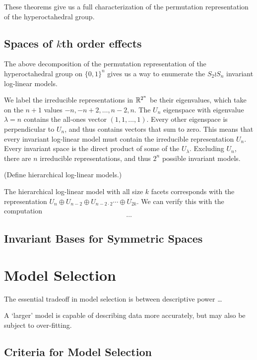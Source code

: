 \documentclass[cclicense]{hmcthesis}
\numberwithin{equation}{chapter}
\numberwithin{thmcounter}{chapter}
\begin{document}
    These theorems give us a full characterization of the permutation
    representation of the hyperoctahedral group.


\section{Spaces of $k$th order effects}

    The above decomposition of the permutation representation of the
    hyperoctahedral group on $\{0, 1\}^n$ gives us a way to enumerate the $S_2
    \wr S_n$ invariant log-linear models.

    We label the irreducible representations in $\mathbb{R}^{2^n}$ be their eigenvalues,
    which take on the $n+1$ values $-n, -n + 2, \ldots, n - 2, n$.  The
    $U_n$ eigenspace with eigenvalue $\lambda = n$ contains the all-ones vector $(1,1,
    \ldots, 1)$.  Every other eigenspace is perpendicular to $U_n$, and thus
    contains vectors that sum to zero.  This means that every invariant
    log-linear model must contain the irreducible representation $U_n$.  Every
    invariant space is the direct product of some of the $U_\lambda$.  Excluding
    $U_n$, there are $n$ irreducible representations, and thus $2^n$ possible
    invariant models.

    (Define hierarchical log-linear models.)

    The hierarchical log-linear model with all size $k$ facets corresponds with
    the representation $U_n \oplus U_{n-2} \oplus U_{n-2\cdot2}\cdots \oplus U_{2k}$.
    We can verify this with the computation
    \[
        \ldots
    \]

\section{Invariant Bases for Symmetric Spaces}

\chapter{Model Selection}

    The essential tradeoff in model selection is between descriptive power \ldots

    A `larger' model is capable of describing data more accurately, but may also be
    subject to over-fitting.


\section{Criteria for Model Selection}
\end{document}
